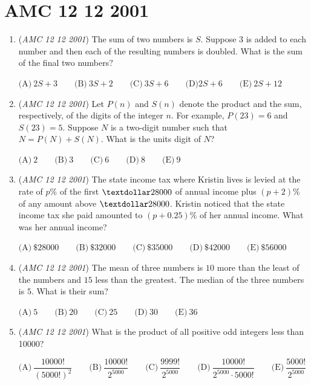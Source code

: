 \section{AMC 12 12 2001}
        \begin{enumerate}
        	\item (\textit{AMC 12 12 2001}) The sum of two numbers is $S$. Suppose $3$ is added to each number and then
each of the resulting numbers is doubled. What is the sum of the final two
numbers?


 $\text{(A)}\ 2S + 3\qquad \text{(B)}\ 3S + 2\qquad \text{(C)}\ 3S + 6 \qquad\text{(D)} 2S + 6 \qquad \text{(E)}\ 2S + 12$


	\item (\textit{AMC 12 12 2001}) Let $P(n)$ and $S(n)$ denote the product and the sum, respectively, of the digits
of the integer $n$. For example, $P(23) = 6$ and $S(23) = 5$. Suppose $N$ is a
two-digit number such that $N = P(N)+S(N)$. What is the units digit of $N$?


 $\text{(A)}\ 2\qquad \text{(B)}\ 3\qquad \text{(C)}\ 6\qquad \text{(D)}\ 8\qquad \text{(E)}\ 9$


	\item (\textit{AMC 12 12 2001}) The state income tax where Kristin lives is levied at the rate of $p\%$ of the first
$\textdollar 28000$ of annual income plus $(p + 2)\%$ of any amount above $\textdollar 28000$. Kristin
noticed that the state income tax she paid amounted to $(p + 0.25)\%$ of her
annual income. What was her annual income?


 $\text{(A)}\ \$28000\qquad \text{(B)}\ \$32000\qquad \text{(C)}\ \$35000\qquad \text{(D)}\ \$42000\qquad \text{(E)}\ \$56000$


	\item (\textit{AMC 12 12 2001}) The mean of three numbers is $10$ more than the least of the numbers and $15$
less than the greatest. The median of the three numbers is $5$. What is their
sum?


 $\text{(A)}\ 5\qquad \text{(B)}\ 20\qquad \text{(C)}\ 25\qquad \text{(D)}\ 30\qquad \text{(E)}\ 36$


	\item (\textit{AMC 12 12 2001}) What is the product of all positive odd integers less than 10000?


 $\text{(A)}\ \dfrac{10000!}{(5000!)^2}\qquad \text{(B)}\ \dfrac{10000!}{2^{5000}}\qquad \text{(C)}\ \dfrac{9999!}{2^{5000}}\qquad \text{(D)}\ \dfrac{10000!}{2^{5000} \cdot 5000!}\qquad \text{(E)}\ \dfrac{5000!}{2^{5000}}$



\end{enumerate}
